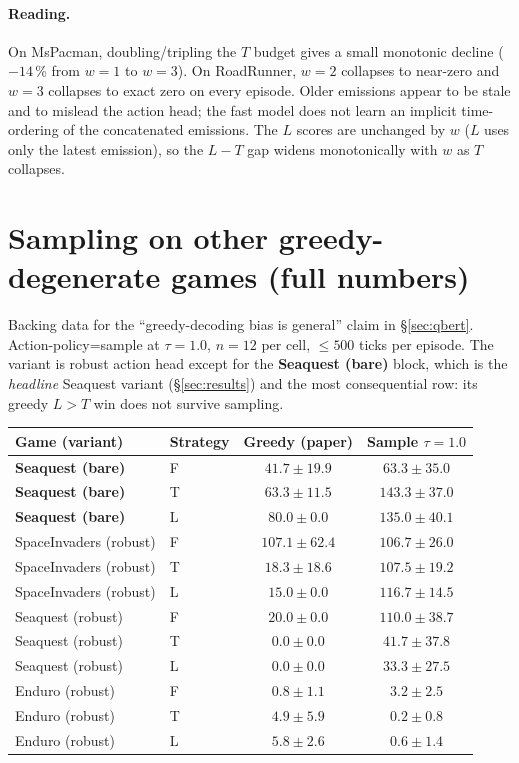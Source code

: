 \documentclass[11pt]{article}
\begin{document}
\paragraph{Reading.} On MsPacman, doubling/tripling the $T$ budget gives a small monotonic decline ($-14$\,\% from $w\!=\!1$ to $w\!=\!3$). On RoadRunner, $w\!=\!2$ collapses to near-zero and $w\!=\!3$ collapses to exact zero on every episode. Older emissions appear to be stale and to mislead the action head; the fast model does not learn an implicit time-ordering of the concatenated emissions. The $L$ scores are unchanged by $w$ ($L$ uses only the latest emission), so the $L\!-\!T$ gap widens monotonically with $w$ as $T$ collapses.

\section{Sampling on other greedy-degenerate games (full numbers)}
\label{app:other_sampling}

Backing data for the ``greedy-decoding bias is general'' claim in \S\ref{sec:qbert}.
Action-policy=sample at $\tau=1.0$, $n\!=\!12$ per cell, $\le\!500$ ticks per episode. The variant
is robust action head except for the \textbf{Seaquest (bare)} block, which is the \emph{headline}
Seaquest variant (\S\ref{sec:results}) and the most consequential row: its greedy $L\!>\!T$ win
does not survive sampling.

\smallskip\noindent
\begin{tabular}{llcc}
\toprule
Game (variant)        & Strategy & Greedy (paper)      & Sample $\tau=1.0$ \\
\midrule
\textbf{Seaquest (bare)} & F     & $41.7\pm19.9$       & $63.3\pm35.0$ \\
\textbf{Seaquest (bare)} & T     & $63.3\pm11.5$       & $\mathbf{143.3\pm37.0}$ \\
\textbf{Seaquest (bare)} & L     & $\mathbf{80.0\pm0.0}$ & $135.0\pm40.1$ \\
\midrule
SpaceInvaders (robust) & F        & $107.1\pm62.4$      & $106.7\pm26.0$ \\
SpaceInvaders (robust) & T        & $18.3\pm18.6$       & $107.5\pm19.2$ \\
SpaceInvaders (robust) & L        & $15.0\pm0.0$        & $\mathbf{116.7\pm14.5}$ \\
\midrule
Seaquest (robust) & F        & $20.0\pm0.0$        & $\mathbf{110.0\pm38.7}$ \\
Seaquest (robust) & T        & $0.0\pm0.0$         & $41.7\pm37.8$ \\
Seaquest (robust) & L        & $0.0\pm0.0$         & $33.3\pm27.5$ \\
\midrule
Enduro (robust)        & F        & $0.8\pm1.1$         & $3.2\pm2.5$ \\
Enduro (robust)        & T        & $4.9\pm5.9$         & $0.2\pm0.8$ \\
Enduro (robust)        & L        & $5.8\pm2.6$         & $0.6\pm1.4$ \\
\bottomrule
\end{tabular}\smallskip
\end{document}
